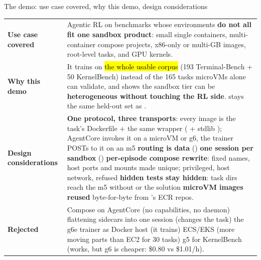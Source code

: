 \begin{frame}{The demo: use case covered, why this demo, design considerations}
\scriptsize\setlength{\tabcolsep}{4pt}
\begin{tabularx}{\textwidth}{@{}P{0.17\textwidth}Y@{}}
\toprule
\textbf{Use case covered} & Agentic RL on benchmarks whose environments \textbf{do not all fit one sandbox product}:
small single containers, multi-container compose projects, x86-only or multi-GB images, root-level tasks, and GPU kernels.\\
\textbf{Why this demo} & It trains on \hl{the whole usable corpus} (193 Terminal-Bench + 50 KernelBench) instead of the 165
tasks microVMs alone can validate, and shows the sandbox tier can be \textbf{heterogeneous without touching the RL side}.
 stays the same held-out set as .\\
\textbf{Design considerations} &
\textbf{One protocol, three transports}: every image is the task's Dockerfile + the same wrapper ( + stdlib
); AgentCore invokes it on a microVM or g6, the trainer POSTs to it on an m5
\textperiodcentered{} \textbf{routing is data} ()
\textperiodcentered{} \textbf{one session per sandbox} ()
\textperiodcentered{} \textbf{per-episode compose rewrite}: fixed names, host ports and  mounts made unique; privileged, host network,  refused
\textperiodcentered{} \textbf{hidden tests stay hidden}: task dirs reach the m5 without  or the solution
\textperiodcentered{} \textbf{microVM images reused} byte-for-byte from 's ECR repos.\\
\textbf{Rejected} & Compose on AgentCore (no capabilities, no daemon) \textperiodcentered{} flattening sidecars into one session
(changes the task) \textperiodcentered{} the g6e trainer as Docker host (it trains) \textperiodcentered{} ECS/EKS (more moving parts than
EC2 for 30 tasks) \textperiodcentered{} g5 for KernelBench (works, but g6 is cheaper: \$0.80 vs \$1.01/h).\\
\bottomrule
\end{tabularx}
\end{frame}

